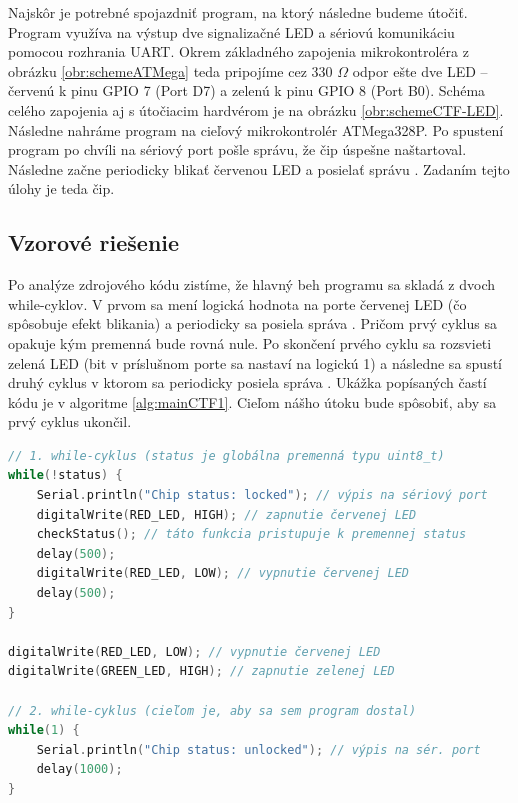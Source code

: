 Najskôr je potrebné spojazdniť program, na ktorý následne budeme útočiť. Program využíva na výstup dve signalizačné LED a sériovú komunikáciu pomocou rozhrania UART. Okrem základného zapojenia mikrokontroléra z obrázku \ref{obr:schemeATMega} teda pripojíme cez 330 $\Omega$ odpor ešte dve LED -- červenú k pinu GPIO 7 (Port D7) a zelenú k pinu GPIO 8 (Port B0). Schéma celého zapojenia aj s útočiacim hardvérom je na obrázku \ref{obr:schemeCTF-LED}. Následne nahráme program na cieľový mikrokontrolér ATMega328P. Po spustení program po chvíli na sériový port pošle správu, že čip úspešne naštartoval. Následne začne periodicky blikať červenou LED a posielať správu . Zadaním tejto úlohy je teda  čip.

\subsection{Vzorové riešenie}
Po analýze zdrojového kódu zistíme, že hlavný beh programu sa skladá z dvoch while-cyklov. V prvom sa mení logická hodnota na porte červenej LED (čo spôsobuje efekt blikania) a periodicky sa posiela správa . Pričom prvý cyklus sa opakuje kým premenná  bude rovná nule. Po skončení prvého cyklu sa rozsvieti zelená LED (bit v príslušnom porte sa nastaví na logickú 1) a následne sa spustí druhý cyklus v ktorom sa periodicky posiela správa . Ukážka  popísaných častí kódu je v algoritme \ref{alg:mainCTF1}. Cieľom nášho útoku bude spôsobiť, aby sa prvý cyklus ukončil.

\begin{lstlisting}[float,language=C,caption={Ukážka kódu hlavnej časti programu z príkladu 1.},label=alg:mainCTF1]
// 1. while-cyklus (status je globálna premenná typu uint8_t)
while(!status) {
    Serial.println("Chip status: locked"); // výpis na sériový port
    digitalWrite(RED_LED, HIGH); // zapnutie červenej LED
    checkStatus(); // táto funkcia pristupuje k premennej status
    delay(500);
    digitalWrite(RED_LED, LOW); // vypnutie červenej LED
    delay(500);
}

digitalWrite(RED_LED, LOW); // vypnutie červenej LED
digitalWrite(GREEN_LED, HIGH); // zapnutie zelenej LED

// 2. while-cyklus (cieľom je, aby sa sem program dostal)
while(1) {
    Serial.println("Chip status: unlocked"); // výpis na sér. port
    delay(1000);
}
\end{lstlisting}

